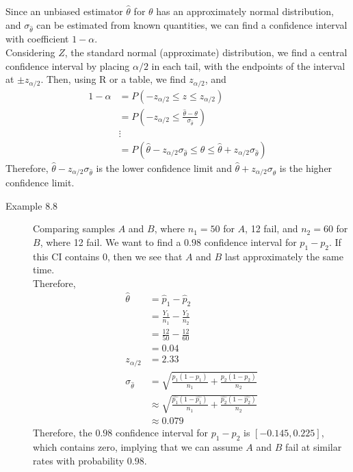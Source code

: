 \documentclass[10pt]{extarticle}
\begin{document}
  Since an unbiased estimator $\hat{\theta}$ for $\theta$ has an approximately normal distribution, and $\sigma_{\hat{\theta}}$ can be estimated from known quantities, we can find a confidence interval with coefficient $1-\alpha$.\\

  Considering $Z$, the standard normal (approximate) distribution, we find a central confidence interval by placing $\alpha/2$ in each tail, with the endpoints of the interval at $\pm z_{\alpha/2}$. Then, using R or a table, we find $z_{\alpha/2}$, and
  \begin{align*}
    1-\alpha &= P(-z_{\alpha/2} \leq z \leq z_{\alpha/2})\\
             &= P\left(-z_{\alpha/2} \leq \frac{\hat{\theta} - \theta}{\sigma_{\hat{\theta}}}\right)\\
             &\vdots\\
             &= P(\hat{\theta} - z_{\alpha/2}\sigma_{\hat{\theta}} \leq \theta \leq \hat{\theta} + z_{\alpha/2}\sigma_{\hat{\theta}})
  \end{align*}
  Therefore, $\hat{\theta} - z_{\alpha/2}\sigma_{\hat{\theta}}$ is the lower confidence limit and $\hat{\theta} + z_{\alpha/2}\sigma_{\hat{\theta}}$ is the higher confidence limit.
  \begin{description}
    \item[Example 8.8] Comparing samples $A$ and $B$, where $n_1 = 50$ for $A$, 12 fail, and $n_2 = 60$ for $B$, where 12 fail. We want to find a $0.98$ confidence interval for $p_1 - p_2$. If this CI contains $0$, then we see that $A$ and $B$ last approximately the same time.\\

      Therefore,
      \begin{align*}
        \hat{\theta} &= \hat{p}_1 - \hat{p}_2\\
                     &= \frac{Y_1}{n_1}-\frac{Y_2}{n_2}\\
                     &= \frac{12}{50}-\frac{12}{60}\\
                     &= 0.04\\
        z_{\alpha/2} &= 2.33\\
        \sigma_{\hat{\theta}} &= \sqrt{\frac{p_1(1-p_1)}{n_1} + \frac{p_2(1-p_2)}{n_2}}\\
                              &\approx \sqrt{\frac{\hat{p_1}(1-\hat{p_1})}{n_1} + \frac{\hat{p_2}(1-\hat{p_2})}{n_2}}\\
                              &\approx 0.079
      \end{align*}
      Therefore, the $0.98$ confidence interval for $p_1-p_2$ is $[-0.145,0.225]$, which contains zero, implying that we can assume $A$ and $B$ fail at similar rates with probability $0.98$.
  \end{description}
\end{document}
